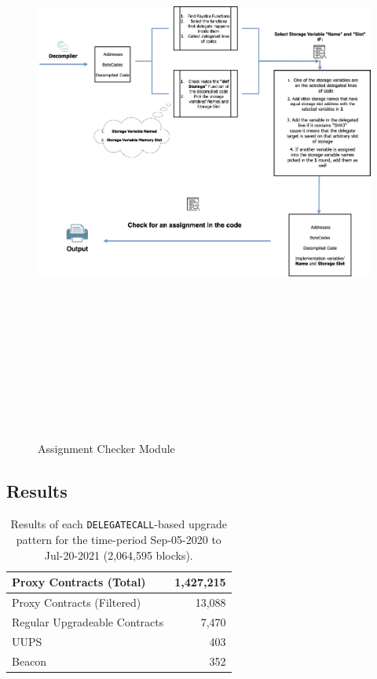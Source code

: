 \begin{figure}[t]
 \centering
 \includegraphics[keepaspectratio,height=20cm, width=15cm]{figures/Assignment-checker-module.png}
 \caption{Assignment Checker Module}
 \label{assignmentFinder}
\end{figure}


 \subsection{Results}

 \begin{table}[t]
 \centering
 \begin{tabular}{|l|r|}
 \hline
 Proxy Contracts (Total) & 1,427,215  \\ \hline 
 Proxy Contracts (Filtered) & 13,088  \\ \hline 
 Regular Upgradeable Contracts & 7,470  \\ \hline
 UUPS & 403  \\ \hline
 Beacon & 352  \\ \hline
 \end{tabular}
 \caption[Results of Proxy Finder Module]{\label{tab:updata} Results of each \texttt{DELEGATECALL}-based upgrade pattern for the time-period {Sep-05-2020} to {Jul-20-2021} (2,064,595 blocks).}
 \vspace{-10pt}
 \end{table}
 
